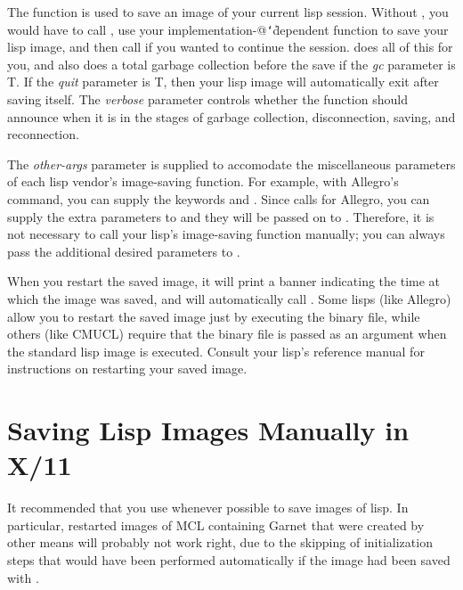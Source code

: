 \vspace{1 line}

The function  is used to save an image of your current
lisp session.  Without , you would have to call
, use your implementation-@{\tt\char`\|}dependent function
to save your lisp image, and then call  if you
wanted to continue the session.   does all of this for
you, and also does a total garbage collection before the save if the {\it gc}
parameter is T.  If the {\it quit} parameter is T, then your lisp image will
automatically exit after saving itself.  The {\it verbose} parameter controls
whether the function should announce when it is in the stages of garbage
collection, disconnection, saving, and reconnection.

The {\it other-args} parameter is supplied to accomodate the miscellaneous
parameters of each lisp vendor's image-saving function.  For example, with
Allegro's  command, you can supply the keywords 
and .  Since  calls 
for Allegro, you can supply the extra parameters to  and
they will be passed on to .  Therefore, it is not necessary to
call your lisp's image-saving function manually; you can always pass the
additional desired parameters to .

When you restart the saved image, it will print a banner indicating the time
at which the image was saved, and will automatically call
.  Some lisps (like Allegro) allow you to restart
the saved image just by executing the binary file, while others (like CMUCL)
require that the binary file is passed as an argument when the standard lisp
image is executed.  Consult your lisp's reference manual for instructions on
restarting your saved image.


\section{Saving Lisp Images Manually in X/11}

It recommended that you use  whenever possible to save
images of lisp.  In particular, restarted images of MCL containing Garnet that
were created by other means will probably not work right, due to the skipping
of initialization steps that would have been performed automatically if the
image had been saved with .

